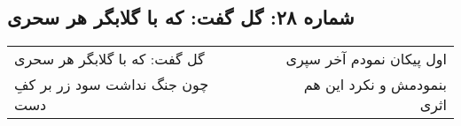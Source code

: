 \begin{center}
\section*{شماره ۲۸: گل گفت: که با گلابگر هر سحری}
\label{sec:028}
\begin{longtable}{l p{0.5cm} r}
گل گفت: که با گلابگر هر سحری
&&
اول پیکان نمودم آخر سپری
\\
چون جنگ نداشت سود زر بر کفِ دست
&&
بنمودمش و نکرد این هم اثری
\\
\end{longtable}
\end{center}
